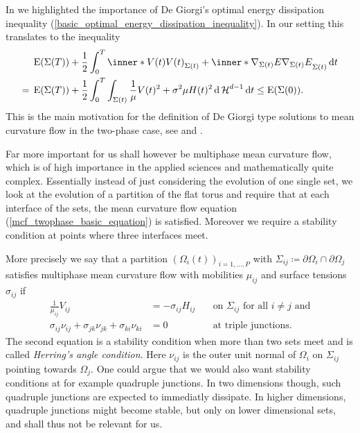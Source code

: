 In  we highlighted the importance of
De Giorgi's optimal energy dissipation inequality (\ref{basic_optimal_energy_dissipation_inequality}). In our setting  this translates to the inequality
\begin{align*}
	& \energy ( \Sigma ( T ) )
	+
	\frac{ 1 }{ 2 }
	\int_{ 0 }^{ T }
		\inner*{ V ( t ) }{ V ( t ) }_{ \Sigma ( t ) }
		+
		\inner*{ \nabla_{ \Sigma ( t ) } E }{ \nabla_{ \Sigma ( t ) } E }_{ 
		\Sigma ( t ) }
	\dd{ t }
	\\
	={}
	&\energy ( \Sigma ( T ) )
	+
	\frac{ 1 }{ 2 }
	\int_{ 0 }^{ T }
		\int_{ \Sigma (t ) }
			\frac{ 1 }{ \mu }
			V( t )^{ 2 } 
			+
			\sigma^{ 2 } \mu 
			H( t ) ^{ 2 }
		\dd{ \hm^{ d - 1 } }
	\dd{ t }
	\leq
	\energy ( \Sigma ( 0 ) ).
\end{align*}
This is the main motivation for the definition of De Giorgi type solutions to 
mean curvature flow in the two-phase case, see 
 and 
.

Far more important for us shall however be multiphase mean curvature flow, 
which is of high importance in the applied sciences and mathematically quite 
complex. 
Essentially instead of just considering the evolution of one single set, we 
look at the evolution of a partition of the flat torus and require that at each 
interface of the sets, the mean curvature flow equation 
(\ref{mcf_twophase_basic_equation}) is satisfied. Moreover we require a 
stability condition at points where three interfaces meet.

More precisely we say that a partition $ ( \Omega_{ i } ( t ) )_{ i = 1 , 
\dotsc , P } $ with 
$ \Sigma_{ i j } \coloneqq \partial \Omega_{ i } \cap \partial \Omega_{ j } $ 
satisfies multiphase mean curvature flow with mobilities $ \mu_{ i j } $ and 
surface 
tensions $ \sigma_{ i j } $ if 
\begin{align}
		\label{v_is_equal_to_h}
		\frac{ 1 }{ \mu_{ i j } }
		V_{ i j }
		& =
		-
		\sigma_{ i  j }
		H_{ i j }
		\quad
		&\text{on } \Sigma_{i j }\text{ for all }i\neq j \text{ and}
		\\
		\label{herrings_angle_condition}
			\sigma_{ i j }
			\nu_{ i j }
			+
			\sigma_{ j k }
			\nu_{ j k }
			+
			\sigma_{ k i }
			\nu_{ k i }
		& =
		0
		& \text{at triple junctions}.
\end{align}
The second equation is a stability condition when more than two sets meet and is
called \emph{Herring's angle condition}. Here $ \nu_{ i j } $ is the outer unit 
normal of $ \Omega_{ i } $
on $ \Sigma_{ i j } $ pointing towards $ \Omega_{ j } $. 
One could argue that we would also want stability conditions at for example 
quadruple 
junctions. In two dimensions though, such quadruple junctions are expected to 
immediatly dissipate. In higher dimensions, quadruple junctions might become 
stable, but only on lower dimensional sets, and shall thus not be relevant for 
us.

